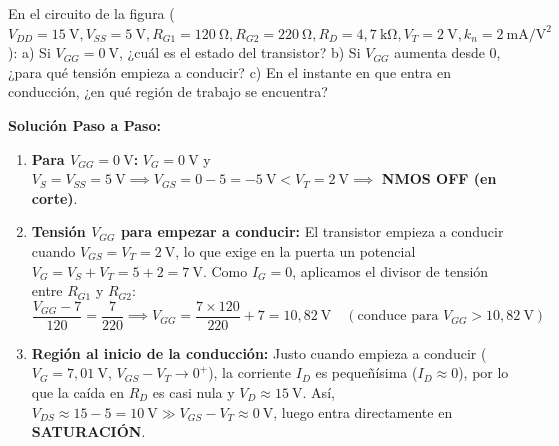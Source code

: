 \begin{ejercicio}
En el circuito de la figura ($V_{DD} = 15\ \si{\volt}, V_{SS} = 5\ \si{\volt}, R_{G1} = 120\ \si{\ohm}, R_{G2} = 220\ \si{\ohm}, R_D = 4{,}7\ \si{\kilo\ohm}, V_T = 2\ \si{\volt}, k_n = 2\ \si{\milli\ampere\per\volt\squared}$):
a) Si $V_{GG} = 0\ \si{\volt}$, ¿cuál es el estado del transistor?
b) Si $V_{GG}$ aumenta desde $0$, ¿para qué tensión empieza a conducir?
c) En el instante en que entra en conducción, ¿en qué región de trabajo se encuentra?
\tcbline
\begin{center}
\end{center}
\textbf{Solución Paso a Paso:}\\[4pt]
\begin{enumerate}[label=\alph*)]
    \item \textbf{Para $V_{GG} = 0\ \si{\volt}$:} $V_G = 0\ \si{\volt}$ y $V_S = V_{SS} = 5\ \si{\volt} \implies V_{GS} = 0 - 5 = -5\ \si{\volt} < V_T = 2\ \si{\volt} \implies$ \textbf{NMOS OFF (en corte)}.
    \item \textbf{Tensión $V_{GG}$ para empezar a conducir:} El transistor empieza a conducir cuando $V_{GS} = V_T = 2\ \si{\volt}$, lo que exige en la puerta un potencial $V_G = V_S + V_T = 5 + 2 = 7\ \si{\volt}$. Como $I_G = 0$, aplicamos el divisor de tensión entre $R_{G1}$ y $R_{G2}$:
    \begin{equation}
        \frac{V_{GG} - 7}{120} = \frac{7}{220} \implies V_{GG} = \frac{7 \times 120}{220} + 7 = 10{,}82\ \si{\volt} \quad (\text{conduce para } V_{GG} > 10{,}82\ \si{\volt})
    \end{equation}
    \item \textbf{Región al inicio de la conducción:} Justo cuando empieza a conducir ($V_G = 7{,}01\ \si{\volt}$, $V_{GS} - V_T \to 0^+$), la corriente $I_D$ es pequeñísima ($I_D \approx 0$), por lo que la caída en $R_D$ es casi nula y $V_D \approx 15\ \si{\volt}$. Así, $V_{DS} \approx 15 - 5 = 10\ \si{\volt} \gg V_{GS} - V_T \approx 0\ \si{\volt}$, luego entra directamente en \textbf{SATURACIÓN}.
\end{enumerate}
\end{ejercicio}

